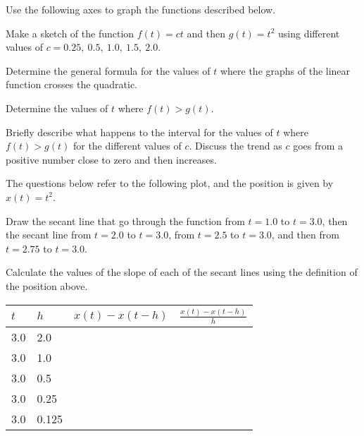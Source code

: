 \begin{problem}
\item Use the following axes to graph the functions described below.

  \scalebox{0.7}{}

  \begin{subproblem}
  \item Make a sketch of the function $f(t)=c t$ and then $g(t)=t^2$
    using different values of $c=0.25,~0.5,~1.0,~1.5,~2.0$.
  \item Determine the general formula for the values of $t$
    where the graphs of the linear function crosses the quadratic.
    \vfill
  \item Determine the values of $t$ where $f(t)>g(t)$.
    \vfill
    \clearpage
  \item Briefly describe what happens to the interval for the
    values of $t$ where $f(t)>g(t)$
    for the different values of
    $c$. Discuss the trend as $c$ goes from a positive number close to
    zero and then increases.
    \vfill
  \end{subproblem}

  \clearpage

\item The questions below refer to the following plot, and the
  position is given by $x(t)=t^2$.
  \label{activity:3:graph}

  \scalebox{0.7}{}

  \begin{subproblem}
  \item Draw the secant line that go through the function from $t=1.0$
    to $t=3.0$, then the secant line from $t=2.0$ to $t=3.0$, from
    $t=2.5$ to $t=3.0$, and then from $t=2.75$ to $t=3.0$.
  \item Calculate the values of the slope of each of the secant lines
    using the definition of the position above. \\
    \begin{tabular}{l|l|l|l}
      $t$ & $h$   & $x(t)-x(t-h)$ & $\frac{x(t)-x(t-h)}{h}$ \\ \hline
      3.0 & 2.0   & & \\ [15pt]
      3.0 & 1.0   & & \\ [15pt]
      3.0 & 0.5   & & \\ [15pt]
      3.0 & 0.25  & & \\ [15pt]
      3.0 & 0.125 & & \\ [15pt]
    \end{tabular}


\end{subproblem}
\end{problem}
